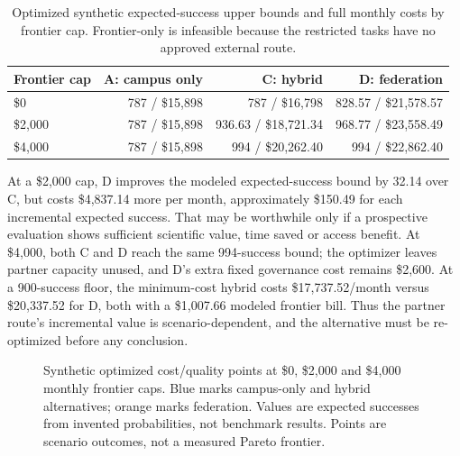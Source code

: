 \begin{table}[ht]
\centering\small
\caption{Optimized synthetic expected-success upper bounds and full monthly costs by frontier cap. Frontier-only is infeasible because the restricted tasks have no approved external route.}
\label{tab:frontier}
\begin{tabular}{lrrr}
\toprule
Frontier cap & A: campus only & C: hybrid & D: federation \\
\midrule
\$0 & 787 / \$15,898 & 787 / \$16,798 & 828.57 / \$21,578.57 \\
\$2,000 & 787 / \$15,898 & 936.63 / \$18,721.34 & 968.77 / \$23,558.49 \\
\$4,000 & 787 / \$15,898 & 994 / \$20,262.40 & 994 / \$22,862.40 \\
\bottomrule
\end{tabular}
\end{table}

At a \$2,000 cap, D improves the modeled expected-success bound by 32.14 over C, but costs \$4,837.14 more per month, approximately \$150.49 for each incremental expected success. That may be worthwhile only if a prospective evaluation shows sufficient scientific value, time saved or access benefit. At \$4,000, both C and D reach the same 994-success bound; the optimizer leaves partner capacity unused, and D's extra fixed governance cost remains \$2,600. At a 900-success floor, the minimum-cost hybrid costs \$17,737.52/month versus \$20,337.52 for D, both with a \$1,007.66 modeled frontier bill. Thus the partner route's incremental value is scenario-dependent, and the alternative must be re-optimized before any conclusion.

\ifShowDiagrams
\begin{figure}[ht]
\centering
{}
\caption{Synthetic optimized cost/quality points at \$0, \$2,000 and \$4,000 monthly frontier caps. Blue marks campus-only and hybrid alternatives; orange marks federation. Values are expected successes from invented probabilities, not benchmark results. Points are scenario outcomes, not a measured Pareto frontier.}
\label{fig:frontier}
\end{figure}
\fi

